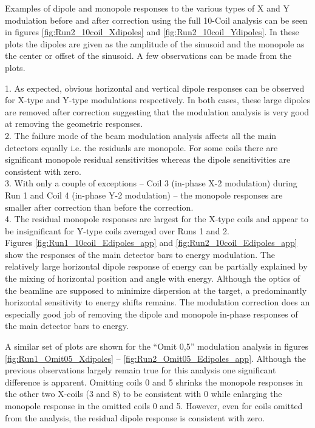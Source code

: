  Examples of dipole and monopole responses to the various types of X and Y modulation before and after correction using the full 10-Coil analysis can be seen in figures \ref{fig:Run2_10coil_Xdipoles} and \ref{fig:Run2_10coil_Ydipoles}. In these plots the dipoles are given as the amplitude of the sinusoid and the monopole as the center or offset of the sinusoid. A few observations can be made from the plots.

1. As expected, obvious horizontal and vertical dipole responses can be observed for X-type and Y-type modulations respectively. In both cases, these large dipoles are removed after correction suggesting that the modulation analysis is very good at removing the geometric responses. \\
2. The failure mode of the beam modulation analysis affects all the main detectors equally i.e. the residuals are monopole. For some coils there are significant monopole residual sensitivities whereas the dipole sensitivities are consistent with zero.\\
3. With only a couple of exceptions -- Coil 3 (in-phase X-2 modulation) during Run 1  and Coil 4 (in-phase Y-2 modulation) -- the monopole responses are smaller after correction than before the correction. \\
4. The residual monopole responses are largest for the X-type coils and appear to be insignificant for Y-type coils averaged over Runs 1 and 2.\\ 

Figures \ref{fig:Run1_10coil_Edipoles_app} and \ref{fig:Run2_10coil_Edipoles_app} show the responses of the main detector bars to energy modulation. The relatively large horizontal dipole response of energy can be partially explained by the mixing of horizontal position and angle with energy. Although the optics of the beamline are supposed to minimize dispersion at the target, a predominantly horizontal sensitivity to energy shifts remains. The modulation correction does an especially good job of removing the dipole and monopole in-phase responses of the main detector bars to energy.

A similar set of plots are shown for the ``Omit 0,5'' modulation analysis in figures \ref{fig:Run1_Omit05_Xdipoles} -- \ref{fig:Run2_Omit05_Edipoles_app}. Although the previous observations largely remain true for this analysis one significant difference is apparent. Omitting coils 0 and 5 shrinks the monopole responses in the other two X-coils (3 and 8) to be consistent with 0 while enlarging the monopole response in the omitted coils 0 and 5. However, even for coils omitted from the analysis, the residual dipole response is consistent with zero.\\ 

